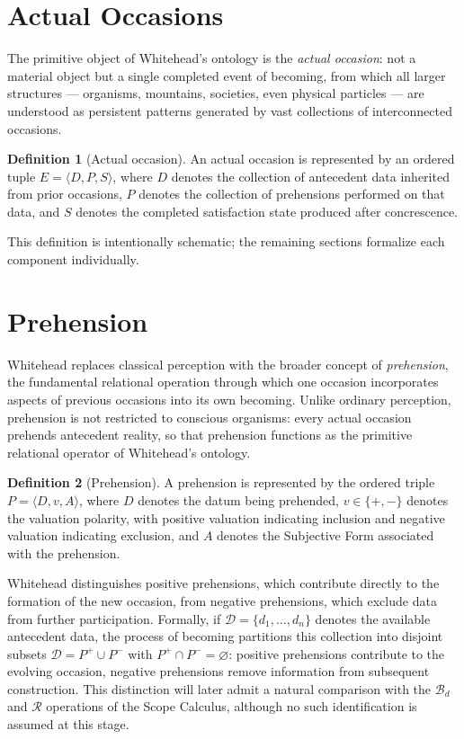 \documentclass[11pt,twoside,openright]{book}
\numberwithin{equation}{chapter}
\theoremstyle{definition}
\newtheorem{definition}{Definition}[chapter]
\theoremstyle{plain}
\theoremstyle{remark}
\theoremstyle{definition}
\newcommand{\Refuse}{\mathcal{R}}
\newcommand{\Bind}{\mathcal{B}_d}
\newcommand{\Domain}{\mathcal{D}}
\newcommand{\WData}{D}
\newcommand{\WPrehensions}{P}
\newcommand{\WValuation}{v}
\newcommand{\WSatisfaction}{S}
\newcommand{\WSubjForm}{A}
\newcommand{\WOccasion}{E}
\begin{document}
\section{Actual Occasions}

The primitive object of Whitehead's ontology is the \emph{actual
occasion}: not a material object but a single completed event of
becoming, from which all larger structures --- organisms, mountains,
societies, even physical particles --- are understood as persistent
patterns generated by vast collections of interconnected occasions.

\begin{definition}[Actual occasion]
An actual occasion is represented by an ordered tuple
$\WOccasion=\langle \WData,\WPrehensions,\WSatisfaction\rangle$, where
$\WData$ denotes the collection of antecedent data inherited from prior
occasions, $\WPrehensions$ denotes the collection of prehensions
performed on that data, and $\WSatisfaction$ denotes the completed
satisfaction state produced after concrescence.
\end{definition}

This definition is intentionally schematic; the remaining sections
formalize each component individually.

\section{Prehension}

Whitehead replaces classical perception with the broader concept of
\emph{prehension}, the fundamental relational operation through which one
occasion incorporates aspects of previous occasions into its own becoming.
Unlike ordinary perception, prehension is not restricted to conscious
organisms: every actual occasion prehends antecedent reality, so that
prehension functions as the primitive relational operator of Whitehead's
ontology.

\begin{definition}[Prehension]
A prehension is represented by the ordered triple
$\WPrehensions=\langle \WData,\WValuation,\WSubjForm\rangle$, where
$\WData$ denotes the datum being prehended, $\WValuation\in\{+,-\}$
denotes the valuation polarity, with positive valuation indicating
inclusion and negative valuation indicating exclusion, and $\WSubjForm$
denotes the Subjective Form associated with the prehension.
\end{definition}

Whitehead distinguishes positive prehensions, which contribute directly
to the formation of the new occasion, from negative prehensions, which
exclude data from further participation. Formally, if
$\Domain=\{d_1,\ldots,d_n\}$ denotes the available antecedent data, the
process of becoming partitions this collection into disjoint subsets
$\Domain=P^{+}\cup P^{-}$ with $P^{+}\cap P^{-}=\varnothing$: positive
prehensions contribute to the evolving occasion, negative prehensions
remove information from subsequent construction. This distinction will
later admit a natural comparison with the $\Bind$ and $\Refuse$
operations of the Scope Calculus, although no such identification is
assumed at this stage.
\end{document}

